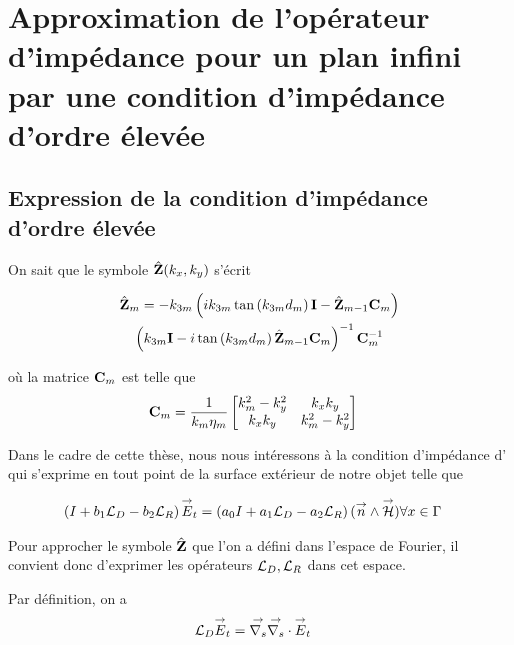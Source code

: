 \section{Approximation de l'opérateur d'impédance pour un plan infini par une condition d'impédance d'ordre élevée}

  \subsection{Expression de la condition d'impédance d'ordre élevée}

    On sait que le symbole \(\hat{\mathbf{Z}}(k_x,k_y)\) s'écrit

    \begin{multline}
        \hat {\mathbf{Z}}_m = -k_{3m}
        \left(ik_{3m}\tan\left(k_{3m}d_m\right)\mathbf{I} - \hat {\mathbf{Z}}_{m-1}\mathbf{C}_m\right) \\
        \left(k_{3m}\mathbf{I} - i\tan\left(k_{3m}d_m\right)\hat {\mathbf{Z}}_{m-1}\mathbf{C}_m\right)^{-1}
        \mathbf{C}_m^{-1}
    \end{multline}

    où la matrice \(\mathbf{C}_m\) est telle que
    \begin{align}
       \mathbf{C}_m &= \dfrac{1}{k_m\eta_m}
        \begin{bmatrix}
            k_m^2 - k_y^2 & k_xk_y\\
            k_xk_y & k_m^2 - k_y^2
        \end{bmatrix}
    \end{align}

    Dans le cadre de cette thèse, nous nous intéressons à la condition d'impédance d'\cite{aubakirov_electromagnetic_2014} qui s'exprime en tout point de la surface extérieur de notre objet telle que

    \begin{align}
        \left(I + b_1 {\mathcal{L}_D}{} -b_2 {\mathcal{L}_R} \right){\overset{\rightarrow}{E}}_t = \left(a_0 I + a_1 {\mathcal{L}_D}{} - a_2 {\mathcal{L}_R} \right)({\overset{\rightarrow}{n}} \wedge {\overset{\rightarrow}{\mathcal{H}}}) & \forall x \in \Gamma
    \end{align}

    Pour approcher le symbole \(\hat{\mathbf{Z}}\) que l'on a défini dans l'espace de Fourier, il convient donc d'exprimer les opérateurs \({\mathcal{L}_D}, {\mathcal{L}_R}\) dans cet espace.


    Par définition, on a 
    \begin{align}
      {\mathcal{L}_D} {\overset{\rightarrow}{E}}_t & = {\overset{\rightarrow}{\nabla_s}}{} {\overset{\rightarrow}{\nabla_s}} \cdot{} {\overset{\rightarrow}{E}}_t
    \end{align}

